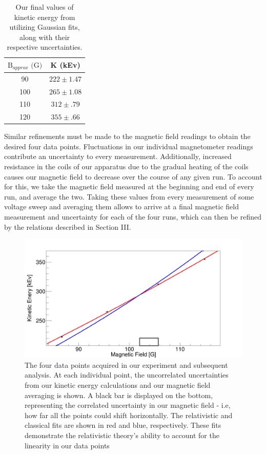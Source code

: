   \begin{table}
    \begin{tabular}{||c c||}
      \hline
      $\text{B}_{approx} \text{ (G)}$ & K (kEv) \\
      \hline
      \hline
      90 & $222 \pm 1.47$  \\
      \hline
      100 & $265 \pm 1.08$ \\
      \hline
      110 & $312 \pm .79$  \\
      \hline
      120 & $355 \pm .66$  \\
      \hline
    \end{tabular}
  \caption{Our final values of kinetic energy from utilizing Gaussian fits, along with their respective uncertainties.}
  \label{energy}
\end{table}

Similar refinements must be made to the magnetic field readings to obtain the desired four data points. Fluctuations in our individual magnetometer readings contribute an uncertainty to every measurement. Additionally, increased resistance in the coils of our apparatus due to the gradual heating of the coils causes our magnetic field to decrease over the course of any given run. To account for this, we take the magnetic field measured at the beginning and end of every run, and average the two.  Taking these values from every measurement of some voltage sweep and averaging them allows to arrive at a final magnetic field measurement and uncertainty for each of the four runs, which can then be refined by the relations described in Section III.

\begin{figure}[t]
  \includegraphics[width=.5\textwidth]{sysgraphpaper.pdf}
\caption{The four data points acquired in our experiment and subsequent analysis. At each individual point, the uncorrelated uncertainties from our kinetic energy calculations and our magnetic field averaging is shown. A black bar is displayed on the bottom, representing the correlated uncertainty in our magnetic field - i.e, how far all the points could shift horizontally. The relativistic and classical fits are shown in red and blue, respectively. These fits demonstrate the relativistic theory's ability to account for the linearity in our data points}
  \label{sys}
\end{figure}

